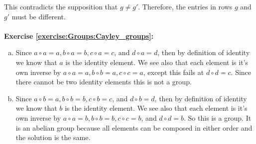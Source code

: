 \noindent
This contradicts the supposition that $g \neq g'$.  Therefore, the entries in rows $g$ and $g'$ must be different.\\
\\

\noindent\textbf{Exercise \ref{exercise:Groups:Cayley_groups}:}
\begin{enumerate}[(a)]

\item
Since $a \circ a = a, b \circ a = b, c \circ a = c$, and $d \circ a = d$, then by definition of identity we know that $a$ is the identity element.  We see also that each element is it's own inverse by $a \circ a = a, b \circ b = a, c \circ c = a$, except this fails at $d \circ d = c$.  Since there cannot be two identity elements this is not a group.

\item
Since $a \circ b = a, b \circ b = b, c \circ b = c$, and $d \circ b = d$, then by definition of identity we know that $b$ is the identity element.  We see also that each element is it's own inverse by $a \circ a = b, b \circ b = b, c \circ c = b$, and $d \circ d = b$.  So this is a group.  It is an abelian group because all elements can be composed in either order and the solution is the same.


\end{enumerate}
